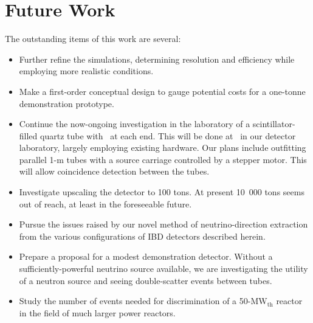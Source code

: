 \section{\label{sec:future}Future Work}

The outstanding items of this work are several:

\begin{itemize} %

    \item Further refine the simulations, determining resolution and efficiency while employing more realistic conditions.

    \item Make a first-order conceptual design to gauge potential costs for a one-tonne demonstration prototype.

    \item Continue the now-ongoing investigation in the laboratory of a scintillator-filled quartz tube with \pmts\ at each end.
    This will be done at \uh\ in our detector laboratory, largely employing existing hardware.
    Our plans include outfitting parallel 1-m tubes with a source carriage controlled by a stepper motor.
    This will allow coincidence detection between the tubes.

    \item Investigate upscaling the detector to 100 tons.
    At present 10~000 tons seems out of reach, at least in the foreseeable future.

    \item Pursue the issues raised by our novel method of neutrino-direction extraction from the various configurations of IBD detectors described herein.

    \item Prepare a proposal for a modest demonstration detector.
    Without a sufficiently-powerful neutrino source available, we are investigating the utility of a neutron source and seeing double-scatter events between tubes.

    \item Study the number of events needed for discrimination of a 50-$\mathrm{MW_{th}}$ reactor in the field of much larger power reactors.

\end{itemize}
